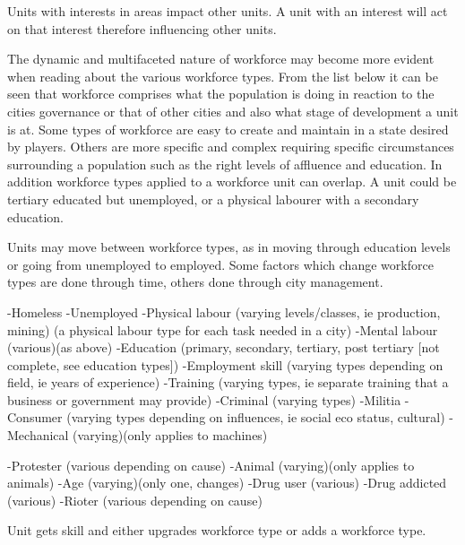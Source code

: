 Units with interests in areas impact other units.
A unit with an interest will act on that interest therefore influencing other units.



The dynamic and multifaceted nature of workforce may become more evident when reading about the various workforce types. From the list below it can be seen that workforce comprises what the population is doing in reaction to the cities governance or that of other cities and also what stage of development a unit is at. Some types of workforce are easy to create and maintain in a state desired by players. Others are more specific and complex requiring specific circumstances surrounding a population such as the right levels of affluence and education. In addition workforce types applied to a workforce unit can overlap. A unit could be tertiary educated but unemployed, or a physical labourer with a secondary education. 

Units may move between workforce types, as in moving through education levels or going from unemployed to employed. Some factors which change workforce types are done through time, others done through city management.


-Homeless
-Unemployed
-Physical labour (varying levels/classes, ie production, mining)
	(a physical labour type for each task needed in a city) 
-Mental labour (various)(as above)
-Education (primary, secondary, tertiary, post tertiary [not complete, see education types])
-Employment skill (varying types depending on field, ie years of experience)
-Training (varying types, ie separate training that a business or government may provide)
-Criminal (varying types)
-Militia
-Consumer (varying types depending on influences, ie social eco status, cultural)
-Mechanical (varying)(only applies to machines)

-Protester (various depending on cause)
-Animal (varying)(only applies to animals)
-Age (varying)(only one, changes)
-Drug user (various)
-Drug addicted (various)
-Rioter (various depending on cause)



Unit gets skill and either upgrades workforce type or adds a workforce type.

